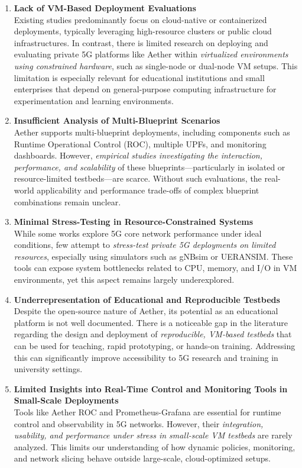 \begin{enumerate}
    \item \textbf{Lack of VM-Based Deployment Evaluations} \\
    Existing studies predominantly focus on cloud-native or containerized deployments, typically leveraging high-resource clusters or public cloud infrastructures. In contrast, there is limited research on deploying and evaluating private 5G platforms like Aether within \textit{virtualized environments using constrained hardware}, such as single-node or dual-node VM setups. This limitation is especially relevant for educational institutions and small enterprises that depend on general-purpose computing infrastructure for experimentation and learning environments.

    \item \textbf{Insufficient Analysis of Multi-Blueprint Scenarios} \\
    Aether supports multi-blueprint deployments, including components such as Runtime Operational Control (ROC), multiple UPFs, and monitoring dashboards. However, \textit{empirical studies investigating the interaction, performance, and scalability} of these blueprints—particularly in isolated or resource-limited testbeds—are scarce. Without such evaluations, the real-world applicability and performance trade-offs of complex blueprint combinations remain unclear.

    \item \textbf{Minimal Stress-Testing in Resource-Constrained Systems} \\
    While some works explore 5G core network performance under ideal conditions, few attempt to \textit{stress-test private 5G deployments on limited resources}, especially using simulators such as gNBsim or UERANSIM. These tools can expose system bottlenecks related to CPU, memory, and I/O in VM environments, yet this aspect remains largely underexplored.

    \item \textbf{Underrepresentation of Educational and Reproducible Testbeds} \\
    Despite the open-source nature of Aether, its potential as an educational platform is not well documented. There is a noticeable gap in the literature regarding the design and deployment of \textit{reproducible, VM-based testbeds} that can be used for teaching, rapid prototyping, or hands-on training. Addressing this can significantly improve accessibility to 5G research and training in university settings.

    \item \textbf{Limited Insights into Real-Time Control and Monitoring Tools in Small-Scale Deployments} \\
    Tools like Aether ROC and Prometheus-Grafana are essential for runtime control and observability in 5G networks. However, their \textit{integration, usability, and performance under stress in small-scale VM testbeds} are rarely analyzed. This limits our understanding of how dynamic policies, monitoring, and network slicing behave outside large-scale, cloud-optimized setups.
\end{enumerate}

